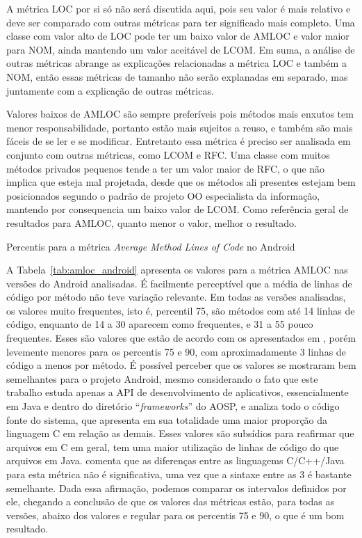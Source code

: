 A métrica LOC por si só não será discutida aqui, pois seu valor é mais relativo e deve ser comparado com outras métricas para ter significado mais completo. Uma classe com valor alto de LOC pode ter um baixo valor de AMLOC e valor maior para NOM, ainda mantendo um valor aceitável de LCOM. Em suma, a análise de outras métricas abrange as explicações relacionadas a métrica LOC e também a NOM, então essas métricas de tamanho não serão explanadas em separado, mas juntamente com a explicação de outras métricas.

Valores baixos de AMLOC são sempre preferíveis pois métodos mais enxutos tem menor responsabilidade, portanto estão mais sujeitos a reuso, e também são mais fáceis de se ler e se modificar. Entretanto essa métrica é preciso ser analisada em conjunto com outras métricas, como LCOM e RFC. Uma classe com muitos métodos privados pequenos tende a ter um valor maior de RFC, o que não implica que esteja mal projetada, desde que os métodos ali presentes estejam bem posicionados segundo o padrão de projeto OO especialista da informação, mantendo por consequencia um baixo valor de LCOM. Como referência geral de resultados para AMLOC, quanto menor o valor, melhor o resultado.

\begin{table}[!htb]

\caption{Percentis para a métrica \textit{Average Method Lines of Code} no Android}
\label{tab:amloc_android}
\end{table}

A Tabela~\ref{tab:amloc_android} apresenta os valores para a métrica AMLOC nas versões do Android analisadas. É facilmente perceptível que a média de linhas de código por método não teve variação relevante. Em todas as versões analisadas, os valores muito frequentes, isto é, percentil 75, são métodos com até 14 linhas de código, enquanto de 14 a 30 aparecem como frequentes, e 31 a 55 pouco frequentes. Esses são valores que estão de acordo com os apresentados em , porém levemente menores para os percentis 75 e 90, com aproximadamente 3 linhas de código a menos por método. É possível perceber que os valores se mostraram bem semelhantes para o projeto Android, mesmo considerando o fato que este trabalho estuda apenas a API de desenvolvimento de aplicativos, essencialmente em Java e dentro do diretório ``\textit{frameworks}'' do AOSP, e  analiza todo o código fonte do sistema, que apresenta em sua totalidade uma maior proporção da linguagem C em relação as demais. Esses valores são subsídios para reafirmar que arquivos em C em geral, tem uma maior utilização de linhas de código do que arquivos em Java.  comenta que as diferenças entre as linguagems C/C++/Java para esta métrica não é significativa, uma vez que a sintaxe entre as 3 é bastante semelhante. Dada essa afirmação, podemos comparar os intervalos definidos por ele, chegando a conclusão de que os valores das métricas estão, para todas as versões, abaixo dos valores e regular para os percentis 75 e 90, o que é um bom resultado.

